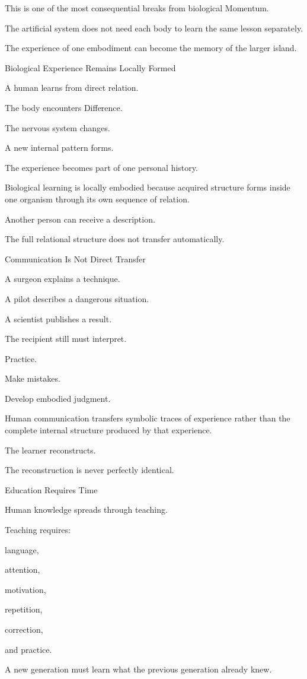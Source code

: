 This is one of the most consequential breaks from biological Momentum.

The artificial system does not need each body to learn the same lesson separately.

The experience of one embodiment can become the memory of the larger island.

Biological Experience Remains Locally Formed

A human learns from direct relation.

The body encounters Difference.

The nervous system changes.

A new internal pattern forms.

The experience becomes part of one personal history.

Biological learning is locally embodied because acquired structure forms inside one organism through its own sequence of relation.

Another person can receive a description.

The full relational structure does not transfer automatically.

Communication Is Not Direct Transfer

A surgeon explains a technique.

A pilot describes a dangerous situation.

A scientist publishes a result.

The recipient still must interpret.

Practice.

Make mistakes.

Develop embodied judgment.

Human communication transfers symbolic traces of experience rather than the complete internal structure produced by that experience.

The learner reconstructs.

The reconstruction is never perfectly identical.

Education Requires Time

Human knowledge spreads through teaching.

Teaching requires:

language,

attention,

motivation,

repetition,

correction,

and practice.

A new generation must learn what the previous generation already knew.

